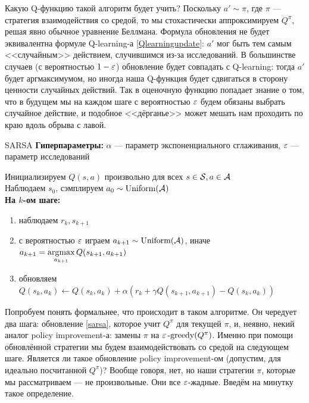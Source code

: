 Какую Q-функцию такой алгоритм будет учить? Поскольку $a' \sim \pi$, где $\pi$ --- стратегия взаимодействия со средой, то мы стохастически аппроксимируем $Q^{\pi}$, решая явно обычное уравнение Беллмана. Формула обновления не будет эквивалентна формуле Q-learning-а \eqref{Qlearningupdate}: $a'$ мог быть тем самым <<случайным>> действием, случившимся из-за исследований. В большинстве случаев (с вероятностью $1 \HM- \eps$) обновление будет совпадать с Q-learning: тогда $a'$ будет аргмаксимумом, но иногда наша Q-функция будет сдвигаться в сторону ценности случайных действий. Так в оценочную функцию попадает знание о том, что в будущем мы на каждом шаге с вероятностью $\varepsilon$ будем обязаны выбрать случайное действие, и подобное <<дёрганье>> может мешать нам проходить по краю вдоль обрыва с лавой.

\begin{algorithm}{SARSA}
\textbf{Гиперпараметры:} $\alpha$ --- параметр экспоненциального сглаживания, $\varepsilon$ --- параметр исследований

\vspace{0.3cm}
Инициализируем $Q(s, a)$ произвольно для всех $s \in \mathcal{S}, a \in \mathcal{A}$ \\
Наблюдаем $s_0$, сэмплируем $a_0 \sim \operatorname{Uniform}(\mathcal{A})$ \\
\textbf{На $k$-ом шаге:}
\begin{enumerate}
    \item наблюдаем $r_k, s_{k+1}$
    \item с вероятностью $\varepsilon$ играем $a_{k+1} \sim \operatorname{Uniform}(\mathcal{A})$, иначе $a_{k+1} = \mathop{\mathrm{argmax}}\limits_{a_{k+1}} Q(s_{k+1}, a_{k+1})$
    \item обновляем $Q(s_k, a_k) \leftarrow Q(s_k, a_k) + \alpha \left( r_k + \gamma Q(s_{k+1}, a_{k+1}) - Q(s_k, a_k) \right)$
\end{enumerate}
\end{algorithm}

Попробуем понять формальнее, что происходит в таком алгоритме. Он чередует два шага: обновление \eqref{sarsa}, которое учит $Q^{\pi}$ для текущей $\pi$, и, неявно, некий аналог policy improvement-а: замены $\pi$ на $\varepsilon\operatorname{-greedy}(Q^{\pi})$. Именно при помощи обновлённой стратегии мы будем взаимодействовать со средой на следующем шаге. Является ли такое обновление policy improvement-ом (допустим, для идеально посчитанной $Q^\pi$)? Вообще говоря, нет, но наши стратегии $\pi$, которые мы рассматриваем --- не произвольные. Они все $\varepsilon$-жадные. Введём на минутку такое определение.


